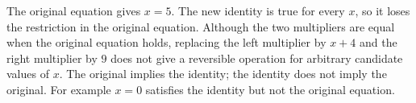 The original equation gives $\boxed{x=5}$. The new identity is true for every $x$, so it loses the restriction in the original equation. Although the two multipliers are equal when the original equation holds, replacing the left multiplier by $x+4$ and the right multiplier by $9$ does not give a reversible operation for arbitrary candidate values of $x$. The original implies the identity; the identity does not imply the original. For example $x=0$ satisfies the identity but not the original equation.
